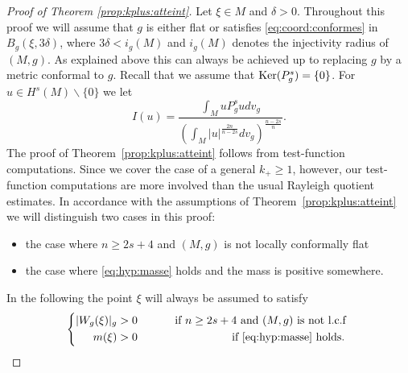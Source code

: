 \documentclass[10pt]{amsart}
\numberwithin{equation}{section}
\def\ker{{\mathop{\rm Ker}}}
\theoremstyle{plain}
\theoremstyle{remark}
\begin{document}
\medskip



\begin{proof}[Proof of Theorem \ref{prop:kplus:atteint}]
Let $\xi \in M$ and $\delta>0$. Throughout this proof we will assume that $g$ is either flat or satisfies \eqref{eq:coord:conformes} in $B_g(\xi, 3 \delta)$, where $3 \delta < i_g(M)$ and $i_g(M)$ denotes the injectivity radius of $(M,g)$. As explained above this can always be achieved up to replacing $g$ by a metric conformal to $g$. Recall that we assume that $\ker(P_g^s) = \{0\}$. For $u \in H^s(M) \backslash \{0\}$ we let 
$$ I(u) = \frac{\int_M u P_g^su dv_g}{\left( \int_M |u|^{\frac{2n}{n-2s}} dv_g \right)^{\frac{n-2s}{n}}}. $$
The proof of Theorem~\ref{prop:kplus:atteint} follows from test-function computations. Since we cover the case of a general $k_+ \ge 1$, however, our test-function computations are more involved than the usual Rayleigh quotient estimates.  In accordance with the assumptions of Theorem~\ref{prop:kplus:atteint} we will distinguish two cases in this proof: 
\begin{itemize}
\item the case where $n \ge 2s+4$ and $(M,g)$ is not locally conformally flat
\item the case where \eqref{eq:hyp:masse} holds and the mass is positive somewhere. 
\end{itemize}
In the following the point $\xi$ will always be assumed to satisfy 
\begin{equation} \label{assumptions:xi}
\left \{ \begin{aligned}
 |W_g(\xi)|_g &>0  &\quad \text{ if } n \ge 2s + 4 \text{ and } (M,g) \text{ is not l.c.f } \\
 m(\xi) & >0  \quad & \text{ if } \eqref{eq:hyp:masse} \text{ holds. } %
\end{aligned} \right. 
\end{equation}

\medskip


\end{proof}
\end{document}
